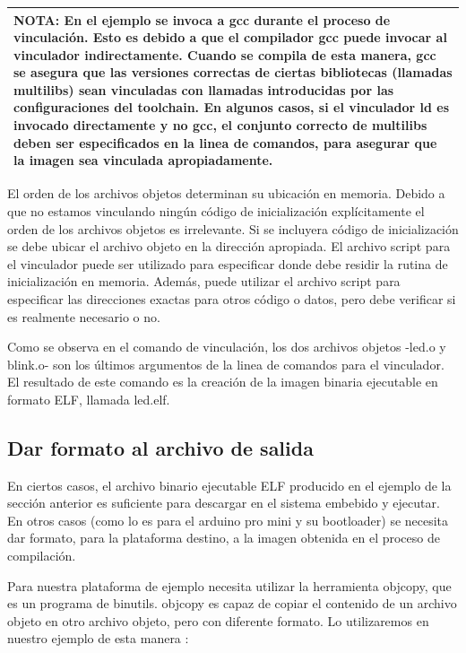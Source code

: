 \documentclass[output=paper, 
colorlinks,
citecolor=brown,
newtxmath
]{langscibook}
\begin{document}
\begin{center}
\begin{tabularx}{\textwidth}{|X|}
\hline
\rowcolor{lightgray}
\textbf{NOTA: En el ejemplo se invoca  a gcc durante el proceso de vinculación.
Esto es debido a que el compilador gcc puede invocar al vinculador indirectamente.
Cuando se compila de esta manera, gcc se asegura que las versiones correctas
de ciertas bibliotecas (llamadas multilibs) sean vinculadas con llamadas
introducidas por las configuraciones del toolchain. En algunos casos, si el vinculador ld es invocado directamente y no gcc, el conjunto correcto de multilibs deben
ser especificados en la linea de comandos, para asegurar que la imagen sea
vinculada apropiadamente.}\\
\hline
\end{tabularx}
\end{center}


El orden de los archivos objetos determinan su ubicación en memoria.
Debido a que no estamos vinculando ningún código de inicialización explícitamente
el orden de los archivos objetos es irrelevante.
Si se incluyera código de inicialización se debe ubicar el archivo objeto 
en la dirección apropiada. El archivo script para el vinculador puede ser 
utilizado para especificar donde debe residir la rutina de inicialización
en memoria. Además, puede utilizar el archivo script para 
especificar las direcciones exactas para otros código o datos, pero debe
verificar si es realmente necesario o no.

Como se observa en el comando de vinculación, los dos archivos objetos -led.o y blink.o-
son los últimos argumentos de la linea de comandos para el vinculador.
El resultado de este comando es la creación de la imagen binaria ejecutable
en formato ELF, llamada led.elf.

\subsection {Dar formato al archivo de salida}

En ciertos casos, el archivo binario ejecutable ELF producido en el 
ejemplo de la sección anterior es suficiente para descargar en el sistema 
embebido y ejecutar. En otros casos (como lo es para el arduino pro mini
y su bootloader) se necesita dar formato, para la plataforma destino,
 a la imagen obtenida
en el proceso de compilación.

Para nuestra plataforma de ejemplo necesita utilizar la herramienta
objcopy, que es un programa de binutils.
objcopy es capaz de copiar el contenido de un archivo objeto en otro 
archivo objeto, pero con diferente formato.
Lo utilizaremos en nuestro ejemplo de esta manera :
\end{document}
